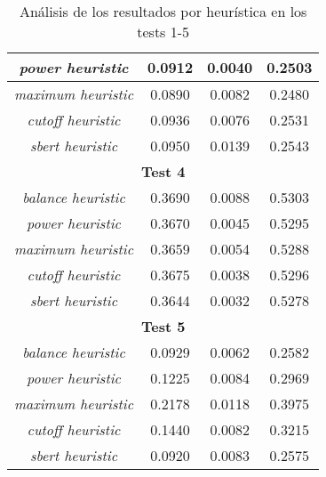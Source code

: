 \documentclass{article}
\begin{document}
\begin{table}[H]
{\begin{tabular}{|c|c|c|c|}
\textit{power heuristic} & 0.0912 & 0.0040 & 0.2503 \\ \hline
\textit{maximum heuristic} & 0.0890 & 0.0082 & 0.2480 \\ \hline
\textit{cutoff heuristic} & 0.0936 & 0.0076 & 0.2531 \\ \hline
\textit{sbert heuristic} & 0.0950 & 0.0139 & 0.2543 \\ \hline
\multicolumn{4}{|c|}{\textbf{Test 4}} \\ \hline
\textit{balance heuristic} & 0.3690 & 0.0088 & 0.5303 \\ \hline
\textit{power heuristic} & 0.3670 & 0.0045 & 0.5295 \\ \hline
\textit{maximum heuristic} & 0.3659 & 0.0054 & 0.5288 \\ \hline
\textit{cutoff heuristic} & 0.3675 & 0.0038 & 0.5296 \\ \hline
\textit{sbert heuristic} & 0.3644 & 0.0032 & 0.5278 \\ \hline
\multicolumn{4}{|c|}{\textbf{Test 5}} \\ \hline
\textit{balance heuristic} & 0.0929 & 0.0062 & 0.2582 \\ \hline
\textit{power heuristic} & 0.1225 & 0.0084 & 0.2969 \\ \hline
\textit{maximum heuristic} & 0.2178 & 0.0118 & 0.3975 \\ \hline
\textit{cutoff heuristic} & 0.1440 & 0.0082 & 0.3215 \\ \hline
\textit{sbert heuristic} & 0.0920 & 0.0083 & 0.2575 \\ \hline
\end{tabular}%
}
\caption{Análisis de los resultados por heurística en los tests 1-5}
\end{table}
\end{document}
